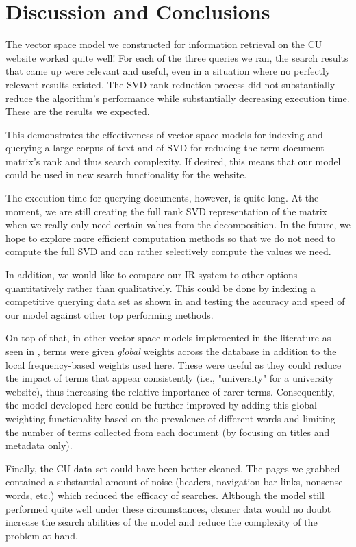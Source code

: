 \section{Discussion and Conclusions} \label{sec:conc}

The vector space model we constructed for information retrieval on the CU website worked quite well! For each of the three queries we ran, the search results that came up were relevant and useful, even in a situation where no perfectly relevant results existed. The SVD rank reduction process did not substantially reduce the algorithm's performance while substantially decreasing execution time. These are the results we expected.

This demonstrates the effectiveness of vector space models for indexing and querying a large corpus of text and of SVD for reducing the term-document matrix's rank and thus search complexity. If desired, this means that our model could be used in new search functionality for the website.

The execution time for querying documents, however, is quite long. At the
moment, we are still creating the full rank SVD representation of the matrix when we really only need certain values from the decomposition. In the future, we hope to explore more efficient computation methods
so that we do not need to compute the full SVD and can rather selectively compute the values we need.

In addition, we would like to compare our IR system to other options quantitatively rather than qualitatively. This could be done by
indexing a competitive querying data set as shown in \cite{kaggledata} and testing the accuracy and speed of our model against other
top performing methods. 

On top of that, in other vector space models implemented in the literature as seen in 
\cite{berry99}, terms were given \textit{global} weights across the database in addition to the local frequency-based weights used here. These were useful as they could reduce the impact of terms that appear consistently (i.e., "university" for a university website), thus increasing the relative importance of rarer terms. Consequently, the model developed here could be further improved by adding this global weighting functionality based on the prevalence of different words and limiting the number of terms collected from each document (by focusing on titles and metadata only).

Finally, the CU data set could have been better cleaned. The pages we grabbed contained a substantial amount of noise (headers, navigation bar links, nonsense words, etc.) which reduced the efficacy of searches. Although the model still performed quite well under these circumstances, cleaner data would no doubt increase the search abilities of the model and reduce the complexity of the problem at hand.


